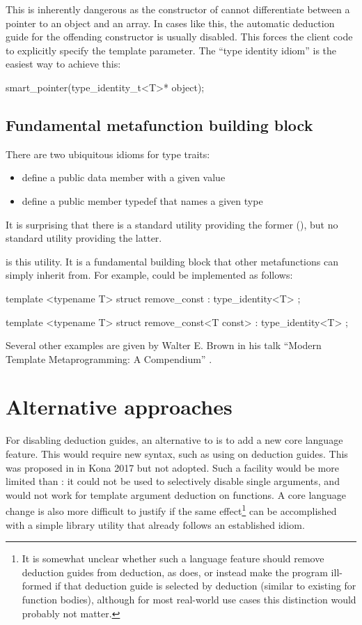 This is inherently dangerous as the constructor of  cannot differentiate between a pointer to an object and an array. In cases like this, the automatic deduction guide for the offending constructor  is usually disabled. This forces the client code to explicitly specify the template parameter. The ``type identity idiom'' is the easiest way to achieve this:
\begin{codeblock}
smart_pointer(type_identity_t<T>* object);
\end{codeblock}
\subsection{Fundamental metafunction building block}

There are two ubiquitous idioms for type traits: 
\begin{itemize}
\item define a public data member  with a given value
\item define a public member typedef  that names a given type
\end{itemize}
It is surprising that there is a standard utility providing the former (), but no standard utility providing the latter.

 is this utility. It is a fundamental building block that other metafunctions can simply inherit from. For example,  could be implemented as follows:
\begin{codeblock}
template <typename T>
struct remove_const : type_identity<T> {};

template <typename T>
struct remove_const<T const> : type_identity<T> {};
\end{codeblock}
Several other examples are given by Walter E. Brown in his talk ``Modern Template Metaprogramming: A Compendium'' \cite{Brown2014}.

\section{Alternative approaches}

For disabling deduction guides, an alternative to  is to add a new core language feature. This would require new syntax, such as using  on deduction guides. This was proposed in \cite{P0091} in Kona 2017 but not adopted. Such a facility would be more limited than : it could not be used to selectively disable single arguments, and would not work for template argument deduction on functions. A core language change is also more difficult to justify if the same effect\footnote{It is somewhat unclear whether such a language feature should remove deduction guides from deduction, as  does, or instead make the program ill-formed if that deduction guide is selected by deduction (similar to existing  for function bodies), although for most real-world use cases this distinction would probably not matter.} can be accomplished with a simple library utility that already follows an established idiom.

